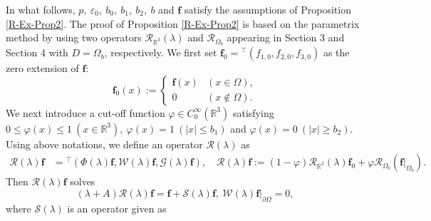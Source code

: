 \documentclass[dvipdfmx,12pt]{article}
\begin{document}
In what follows, $p,~\varepsilon_0,~b_0,~b_1,~b_2,~b$ and $\mathbf{f}$ satisfy the assumptions of Proposition \ref{R-Ex-Prop2}. The proof of Proposition \ref{R-Ex-Prop2} is based on the parametrix method by using two operators $\mathcal{R}_{\mathbb{R}^3}(\lambda)$ and  $\mathcal{R}_{\Omega_{b}}$ appearing in Section 3 and Section 4 with $D=\Omega_{b}$, respectively. We first set $\mathbf{f}_0={}^\top(f_{1,0},f_{2,0},f_{3,0})$ as the zero extension of $\mathbf{f}$:
\[
\mathbf{f}_0(x):=
\begin{cases}
\mathbf{f}(x) & (x\in\Omega), \\
0 & (x\notin\Omega).
\end{cases}
\]
We next introduce a cut-off function $\varphi\in C_0^\infty(\mathbb{R}^3)$ satisfying $0\le \varphi(x) \le1~(x\in\mathbb{R}^3),~\varphi(x)=1~(|x|\le b_1)$
and $\varphi(x)=0~(|x|\ge b_2)$.
Using above notations, we define an operator $\mathcal{R}(\lambda)$ as
\begin{align*}
\mathcal{R}(\lambda)\mathbf{f}&={}^\top (\Phi(\lambda)\mathbf{f}, \mathcal{W}(\lambda)\mathbf{f},\mathcal{G}(\lambda)\mathbf{f}),  \quad
\mathcal{R}(\lambda)\mathbf{f}:=(1-\varphi)\mathcal{R}_{\mathbb{R}^3}(\lambda)\mathbf{f}_0+\varphi\mathcal{R}_{\Omega_{b}}(\mathbf{f}|_{\Omega_b}).
\end{align*}
Then $\mathcal{R}(\lambda)\mathbf{f}$ solves
\begin{equation}\label{pr-R-Ex-Prop2-1}
(\lambda+A)\mathcal{R}(\lambda)\mathbf{f}=\mathbf{f}+\mathcal{S}(\lambda)\mathbf{f},~ \mathcal{W}(\lambda)\mathbf{f}|_{\partial \Omega}=0,
\end{equation}
where $\mathcal{S}(\lambda)$ is an operator given as
\end{document}
